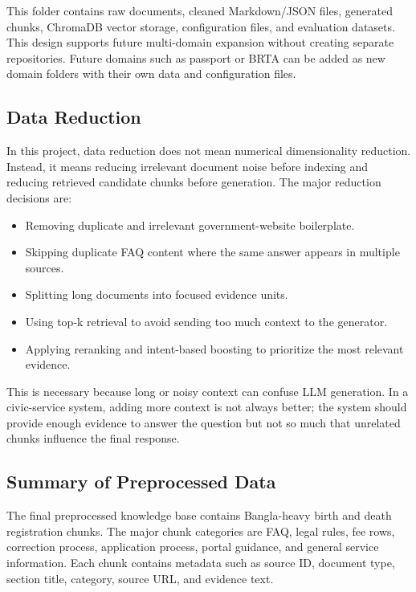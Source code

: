 This folder contains raw documents, cleaned Markdown/JSON files, generated chunks, ChromaDB vector storage, configuration files, and evaluation datasets. This design supports future multi-domain expansion without creating separate repositories. Future domains such as passport or BRTA can be added as new domain folders with their own data and configuration files.

\subsection{Data Reduction}

In this project, data reduction does not mean numerical dimensionality reduction. Instead, it means reducing irrelevant document noise before indexing and reducing retrieved candidate chunks before generation. The major reduction decisions are:

\begin{itemize}
    \item Removing duplicate and irrelevant government-website boilerplate.
    \item Skipping duplicate FAQ content where the same answer appears in multiple sources.
    \item Splitting long documents into focused evidence units.
    \item Using top-k retrieval to avoid sending too much context to the generator.
    \item Applying reranking and intent-based boosting to prioritize the most relevant evidence.
\end{itemize}

This is necessary because long or noisy context can confuse LLM generation. In a civic-service system, adding more context is not always better; the system should provide enough evidence to answer the question but not so much that unrelated chunks influence the final response.

\subsection{Summary of Preprocessed Data}

The final preprocessed knowledge base contains Bangla-heavy birth and death registration chunks. The major chunk categories are FAQ, legal rules, fee rows, correction process, application process, portal guidance, and general service information. Each chunk contains metadata such as source ID, document type, section title, category, source URL, and evidence text.

